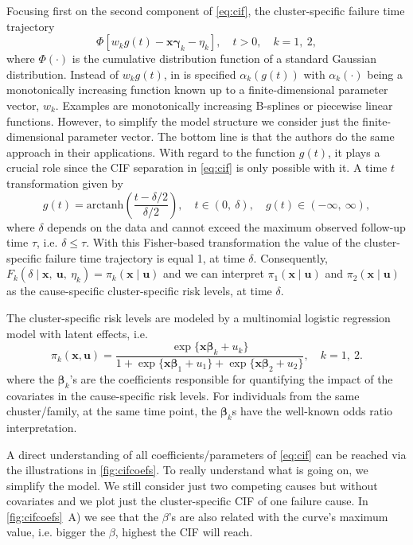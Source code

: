 Focusing first on the second component of \autoref{eq:cif}, the
cluster-specific failure time trajectory
\[
  \Phi[w_{k} g(t) - \bm{x}\bm{\gamma}_{k} - \eta_{k}],
  \quad t > 0, \quad k = 1,~2,
\]
where \(\Phi(\cdot)\) is the cumulative distribution function of a
standard Gaussian distribution. Instead of \(w_{k} g(t)\), in
 is specified \(\alpha_{k}(g(t))\) with
\(\alpha_{k}(\cdot)\) being a monotonically increasing function known up
to a finite-dimensional parameter vector, \(w_{k}\). Examples are
monotonically increasing B-splines or piecewise linear functions.
However, to simplify the model structure we consider just the
finite-dimensional parameter vector. The bottom line is that the authors
do the same approach in their applications. With regard to the function
\(g(t)\), it plays a crucial role since the CIF separation in
\autoref{eq:cif} is only possible with it. A time \(t\) transformation
given by
\[
  g(t) = \text{arctanh}\left(\frac{t - \delta/2}{\delta/2}\right),
  \quad t\in(0,~\delta), \quad g(t)\in(-\infty,~\infty),
\]
where \(\delta\) depends on the data and cannot exceed the maximum
observed follow-up time \(\tau\), i.e. \(\delta \leq \tau\). With this
Fisher-based transformation the value of the cluster-specific failure
time trajectory is equal 1, at time \(\delta\). Consequently, \(F_{k}
(\delta \mid \bm{x},~\bm{u},~\eta_{k}) = \pi_{k}(\bm{x} \mid
\bm{u})\) and we can interpret \(\pi_{1}(\bm{x} \mid \bm{u})\) and
\(\pi_{2}(\bm{x} \mid \bm{u})\) as the cause-specific
cluster-specific risk levels, at time \(\delta\).

The cluster-specific risk levels are modeled by a multinomial logistic
regression model with latent effects, i.e.
\begin{equation}
  \pi_{k}(\bm{x}, \bm{u}) =
  \frac{\exp\{\bm{x}\bm{\beta}_{k} + u_{k}\}}{1 +
    \exp\{\bm{x}\bm{\beta}_{1} + u_{1}\} +
    \exp\{\bm{x}\bm{\beta}_{2} + u_{2}\}}, \quad k = 1,~2.
  \label{eq:risklevel}
\end{equation}
where the \(\bm{\beta}_{k}\)'s are the coefficients responsible for
quantifying the impact of the covariates in the cause-specific risk
levels. For individuals from the same chuster/family, at the same time
point, the \(\bm{\beta}_{k}\)s have the well-known odds ratio
interpretation.

A direct understanding of all coefficients/parameters of
\autoref{eq:cif} can be reached via the illustrations in
\autoref{fig:cifcoefs}. To really understand what is going on, we
simplify the model. We still consider just two competing causes but
without covariates and we plot just the cluster-specific CIF of one
failure cause. In \autoref{fig:cifcoefs}~A) we see that the \(\beta\)'s
are also related with the curve's maximum value, i.e. bigger the
\(\beta\), highest the CIF will reach.

